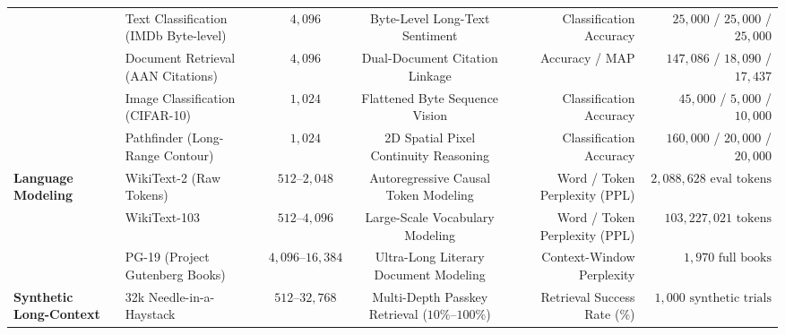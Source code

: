 \begin{table}[!t]
{\begin{tabular}{@{}llccrr@{}}
& Text Classification (IMDb Byte-level) & $4{,}096$ & Byte-Level Long-Text Sentiment & Classification Accuracy & $25{,}000$ / $25{,}000$ / $25{,}000$ \\
& Document Retrieval (AAN Citations) & $4{,}096$ & Dual-Document Citation Linkage & Accuracy / MAP & $147{,}086$ / $18{,}090$ / $17{,}437$ \\
& Image Classification (CIFAR-10) & $1{,}024$ & Flattened Byte Sequence Vision & Classification Accuracy & $45{,}000$ / $5{,}000$ / $10{,}000$ \\
& Pathfinder (Long-Range Contour) & $1{,}024$ & 2D Spatial Pixel Continuity Reasoning & Classification Accuracy & $160{,}000$ / $20{,}000$ / $20{,}000$ \\
\midrule
\multirow{3}{*}{\textbf{Language Modeling}} 
& WikiText-2 (Raw Tokens) & $512\text{--}2{,}048$ & Autoregressive Causal Token Modeling & Word / Token Perplexity (PPL) & $2{,}088{,}628\text{ eval tokens}$ \\
& WikiText-103 & $512\text{--}4{,}096$ & Large-Scale Vocabulary Modeling & Word / Token Perplexity (PPL) & $103{,}227{,}021\text{ tokens}$ \\
& PG-19 (Project Gutenberg Books) & $4{,}096\text{--}16{,}384$ & Ultra-Long Literary Document Modeling & Context-Window Perplexity & $1{,}970\text{ full books}$ \\
\midrule
\textbf{Synthetic Long-Context} 
& 32k Needle-in-a-Haystack & $512\text{--}32{,}768$ & Multi-Depth Passkey Retrieval ($10\%\text{--}100\%$) & Retrieval Success Rate ($\%$) & $1{,}000\text{ synthetic trials}$ \\
\bottomrule
\end{tabular}%
}
\end{table}

